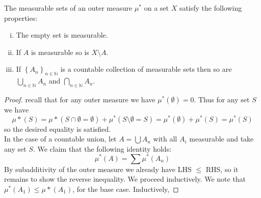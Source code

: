 \documentclass[11pt,x11names]{article}
\newcommand{\nn}{\mathbb{N}}
\newcommand{\set}[1]{\left\{ #1 \right\}}
\begin{document}
\begin{theorem}
\label{Carotheodory sets are measurable}
    The measurable sets of an outer measure $\mu^*$ on a set $X$ satisfy the following properties:
    \begin{enumerate}[(i)]
        \item The empty set is measurable.
        \item If $A$ is measurable so is $X \setminus A$.
        \item If $\set{A_n}_{n \in \nn}$ is a countable collection of measurable sets then so are $\bigcup_{n \in \nn} A_n$ and $\bigcap_{n \in \nn} A_n$.
    \end{enumerate}
\end{theorem}
\begin{proof}

recall that for any outer measure we have $\mu^*(\emptyset) = 0$. Thus for any set $S$ we have 
\begin{equation*}
    \mu*(S) = \mu*(S \cap \emptyset = \emptyset) + \mu^*(S \setminus \emptyset = S) = \mu^*(\emptyset) + \mu^*(S) = \mu^*(S)
\end{equation*}
so the desired equality is satisfied.\\

In the case of a countable union, let $A = \bigcup A_n$  with all $A_i$ measurable and take any set $S$. We claim that the following identity holds:
\begin{equation*}
    \mu^*(A) = \sum \mu^*(A_n)
\end{equation*}
By subadditivity of the outer measure we already have LHS $\leq$ RHS, so it remains to show the reverse inequality. We proceed inductively. We note that $\mu^*(A_1) \leq \mu*(A_1)$, for the base case. Inductively, 
\end{proof}
\end{document}
